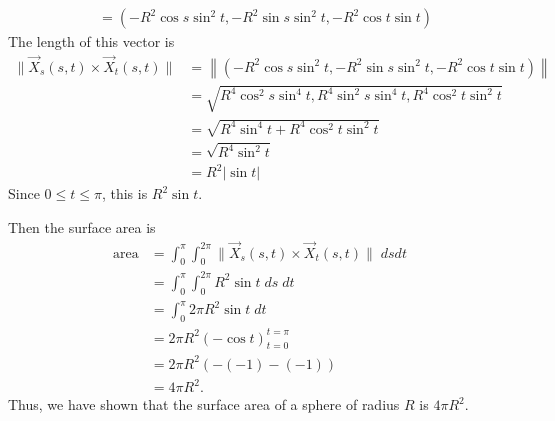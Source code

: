 \documentclass{ximera}
\begin{document}
\begin{example}
\begin{align*}
&= (-R^2\cos s\sin^2t,-R^2\sin s\sin^2 t, -R^2\cos t\sin t)
\end{align*}
The length of this vector is
\begin{align*}
\|\vec{X}_s(s,t)\times \vec{X}_t(s,t)\| &= \left\|(-R^2\cos s\sin^2t,-R^2\sin s\sin^2 t, -R^2\cos t\sin t)\right\|\\
&= \sqrt{R^4\cos^2 s\sin^4t, R^4\sin^2 s\sin^4 t, R^4\cos^2 t\sin^2 t}\\
&= \sqrt{R^4\sin^4t + R^4\cos^2 t\sin^2 t}\\
&= \sqrt{R^4\sin^2 t}\\
&= R^2|\sin t|
\end{align*}
Since  $0\leq t \leq \pi$, this is $R^2\sin t$. 

Then the surface area is
\begin{align*}
\text{area} &= \int_0^{\pi}\int_0^{2\pi}\|\vec{X}_s(s,t)\times \vec{X}_t(s,t)\|\;dsdt\\
&= \int_0^{\pi}\int_0^{2\pi}R^2\sin t\;ds\;dt\\
&= \int_0^{\pi}2\pi R^2\sin t\;dt\\
&= 2\pi R^2(-\cos t)_{t = 0}^{t=\pi}\\
&= 2\pi R^2(-(-1) - (-1))\\
&= 4\pi R^2.
\end{align*}
Thus, we have shown that the surface area of a sphere of radius $R$ is $4\pi R^2$.
\end{example}
\end{document}
